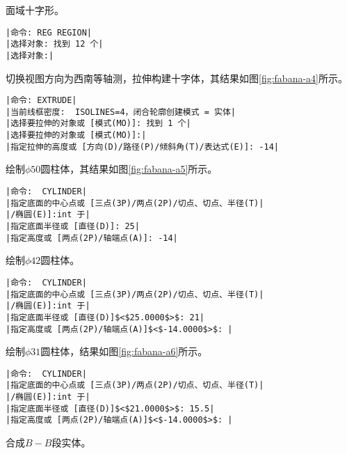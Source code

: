 \begin{procedure}
面域十字形。
\begin{lstlisting}
|命令: REG REGION|
|选择对象: 找到 12 个|
|选择对象:|
\end{lstlisting}
切换视图方向为西南等轴测，拉伸构建十字体，其结果如图\ref{fig:fabana-a4}所示。
\begin{lstlisting}
|命令: EXTRUDE|
|当前线框密度:  ISOLINES=4，闭合轮廓创建模式 = 实体|
|选择要拉伸的对象或 [模式(MO)]: 找到 1 个|
|选择要拉伸的对象或 [模式(MO)]:|
|指定拉伸的高度或 [方向(D)/路径(P)/倾斜角(T)/表达式(E)]: -14|
\end{lstlisting}
\item 绘制$\phi 50$圆柱体，其结果如图\ref{fig:fabana-a5}所示。
\begin{lstlisting}
|命令:  CYLINDER|
|指定底面的中心点或 [三点(3P)/两点(2P)/切点、切点、半径(T)|
|/椭圆(E)]:int 于|
|指定底面半径或 [直径(D)]: 25|
|指定高度或 [两点(2P)/轴端点(A)]: -14|
\end{lstlisting}
\newpage
\item 绘制$\phi 42$圆柱体。
\begin{lstlisting}
|命令:  CYLINDER|
|指定底面的中心点或 [三点(3P)/两点(2P)/切点、切点、半径(T)|
|/椭圆(E)]:int 于|
|指定底面半径或 [直径(D)]$<$25.0000$>$: 21|
|指定高度或 [两点(2P)/轴端点(A)]$<$-14.0000$>$: |
\end{lstlisting}
\begin{figure}[htbp]
\centering
\begin{floatrow}[3]
\end{floatrow}
\end{figure}
\item 绘制$\phi 31$圆柱体，结果如图\ref{fig:fabana-a6}所示。
\begin{lstlisting}
|命令:  CYLINDER|
|指定底面的中心点或 [三点(3P)/两点(2P)/切点、切点、半径(T)|
|/椭圆(E)]:int 于|
|指定底面半径或 [直径(D)]$<$21.0000$>$: 15.5|
|指定高度或 [两点(2P)/轴端点(A)]$<$-14.0000$>$: |
\end{lstlisting}
\item 合成$B-B$段实体。


\end{procedure}
